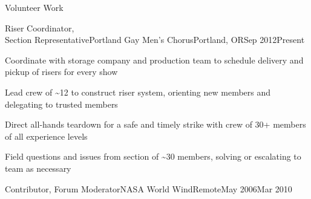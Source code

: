 \documentclass[letterpaper,12pt]{article}
\begin{document}
\begin{paracol}{2}
\begin{rsection}{Volunteer Work}
  \begin{rexperienceitem}{Riser Coordinator,\\Section Representative}{Portland Gay Men's Chorus}{Portland, OR}{Sep 2012}{Present}
    \item Coordinate with storage company and production team to schedule delivery and pickup of risers for every show
    \item Lead crew of \textasciitilde12 to construct riser system, orienting new members and delegating to trusted members
    \item Direct all-hands teardown for a safe and timely strike with crew of 30+ members of all experience levels
    \item Field questions and issues from section of \textasciitilde30 members, solving or escalating to team as necessary
  \end{rexperienceitem}
  \begin{rexperience}{Contributor, Forum Moderator}{NASA World Wind}{Remote}{May 2006}{Mar 2010}
  \end{rexperience}
\end{rsection}

\flushpage
\end{paracol}
\end{document}
